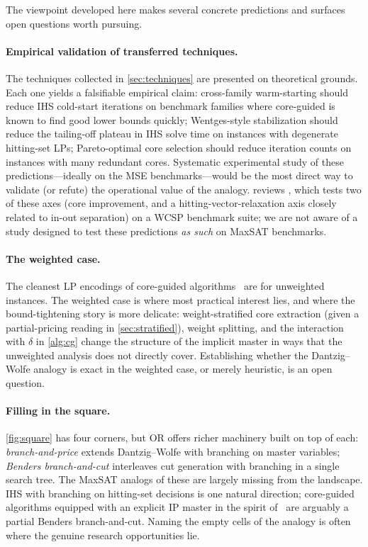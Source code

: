 The viewpoint developed here makes several concrete predictions and surfaces
open questions worth pursuing.

\paragraph{Empirical validation of transferred techniques.} The techniques
collected in \cref{sec:techniques} are presented on theoretical
grounds. Each one yields a falsifiable empirical claim: cross-family
warm-starting should reduce IHS cold-start iterations on benchmark families
where core-guided is known to find good lower bounds quickly; Wentges-style
stabilization should reduce the tailing-off plateau in IHS solve time on
instances with degenerate hitting-set LPs; Pareto-optimal core selection
should reduce iteration counts on instances with many redundant cores.
Systematic experimental study of these predictions---ideally on the MSE
benchmarks---would be the most direct way to validate (or refute) the
operational value of the analogy.  reviews
\citet{petrova2025empirical}, which tests two of these axes (core
improvement, and a hitting-vector-relaxation axis closely related to in-out
separation) on a WCSP benchmark suite; we are not aware of a study designed
to test these predictions \emph{as such} on MaxSAT benchmarks.

\paragraph{The weighted case.} The cleanest LP encodings of core-guided
algorithms~\citep{katsirelos2023analysis} are for unweighted instances. The
weighted case is where most practical interest lies, and where the
bound-tightening story is more delicate: weight-stratified core extraction
(given a partial-pricing reading in \cref{sec:stratified}),
weight splitting, and the interaction with $\delta$ in
\cref{alg:cg} change the structure of the implicit master in ways
that the unweighted analysis does not directly cover. Establishing whether the
Dantzig--Wolfe analogy is exact in the weighted case, or merely heuristic, is
an open question.

\paragraph{Filling in the square.} \cref{fig:square} has four corners,
but OR offers richer machinery built on top of each: \emph{branch-and-price}
extends Dantzig--Wolfe with branching on master variables; \emph{Benders
branch-and-cut} interleaves cut generation with branching in a single
search tree. The MaxSAT analogs of these are largely missing from the
landscape. IHS with branching on hitting-set decisions is one natural
direction; core-guided algorithms equipped with an explicit IP master in the
spirit of~\citet{davies2013exploiting} are arguably a partial Benders
branch-and-cut. Naming the empty cells of the analogy is often where the
genuine research opportunities lie.

